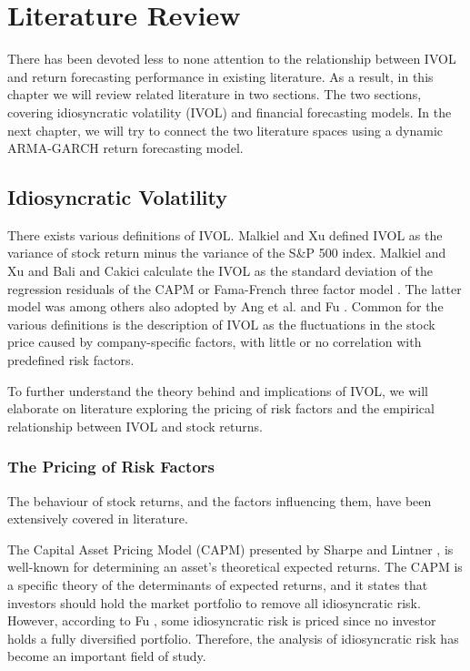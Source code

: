 \chapter{Literature Review}
\label{LR}
There has been devoted less to none attention to the relationship between IVOL and return forecasting performance in existing literature. As a result, in this chapter we will review related literature in two sections. The two sections, covering idiosyncratic volatility (IVOL) and financial forecasting models. In the next chapter, we will try to connect the two literature spaces using a dynamic ARMA-GARCH return forecasting model.  

\section{Idiosyncratic Volatility}  
There exists various definitions of IVOL. Malkiel and Xu \cite{malkielxu97} defined IVOL as the variance of stock return minus the variance of the S\&P 500 index. Malkiel and Xu \cite{malkielxu04} and Bali and Cakici \cite{balicakici08} calculate the IVOL as the standard deviation of the regression residuals of the CAPM or Fama-French three factor model \cite{famafrench}. The latter model was among others also adopted by Ang et al. \cite{angetal06} \cite{angetal09} and Fu \cite{Fu}. Common for the various definitions is the description of IVOL as the fluctuations in the stock price caused by company-specific factors, with little or no correlation with predefined risk factors.

To further understand the theory behind and implications of IVOL, we will elaborate on literature exploring the pricing of risk factors and the empirical relationship between IVOL and stock returns.

\subsection{The Pricing of Risk Factors}
The behaviour of stock returns, and the factors influencing them, have been extensively covered in literature. 

The Capital Asset Pricing Model (CAPM) presented by Sharpe \cite{sharpe} and Lintner \cite{litner}, is well-known for determining an asset's theoretical expected returns. The CAPM is a specific theory of the determinants of expected returns, and it states that investors should hold the market portfolio to remove all idiosyncratic risk. However, according to Fu \cite{Fu}, some idiosyncratic risk is priced since no investor holds a fully diversified portfolio. Therefore, the analysis of idiosyncratic risk has become an important field of study.

